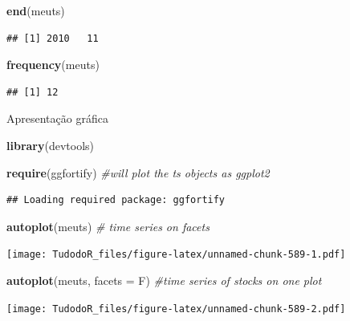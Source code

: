 \documentclass[
]{book}
\newenvironment{Shaded}{\begin{snugshade}}{\end{snugshade}}
\newcommand{\CommentTok}[1]{\textcolor[rgb]{0.56,0.35,0.01}{\textit{#1}}}
\newcommand{\DataTypeTok}[1]{\textcolor[rgb]{0.13,0.29,0.53}{#1}}
\newcommand{\KeywordTok}[1]{\textcolor[rgb]{0.13,0.29,0.53}{\textbf{#1}}}
\newcommand{\NormalTok}[1]{#1}
\begin{document}
\begin{Shaded}
\begin{Highlighting}[]
\KeywordTok{end}\NormalTok{(meuts)}
\end{Highlighting}
\end{Shaded}

\begin{verbatim}
## [1] 2010   11
\end{verbatim}

\begin{Shaded}
\begin{Highlighting}[]
\KeywordTok{frequency}\NormalTok{(meuts)}
\end{Highlighting}
\end{Shaded}

\begin{verbatim}
## [1] 12
\end{verbatim}

Apresentação gráfica

\begin{Shaded}
\begin{Highlighting}[]
\KeywordTok{library}\NormalTok{(devtools)}

\KeywordTok{require}\NormalTok{(ggfortify) }\CommentTok{#will plot the ts objects as ggplot2}
\end{Highlighting}
\end{Shaded}

\begin{verbatim}
## Loading required package: ggfortify
\end{verbatim}

\begin{Shaded}
\begin{Highlighting}[]
\KeywordTok{autoplot}\NormalTok{(meuts) }\CommentTok{# time series on facets}
\end{Highlighting}
\end{Shaded}

\texttt{[image: TudodoR\_files/figure-latex/unnamed-chunk-589-1.pdf]}

\begin{Shaded}
\begin{Highlighting}[]
\KeywordTok{autoplot}\NormalTok{(meuts, }\DataTypeTok{facets =}\NormalTok{ F) }\CommentTok{#time series of stocks on one plot}
\end{Highlighting}
\end{Shaded}

\texttt{[image: TudodoR\_files/figure-latex/unnamed-chunk-589-2.pdf]}
\end{document}
